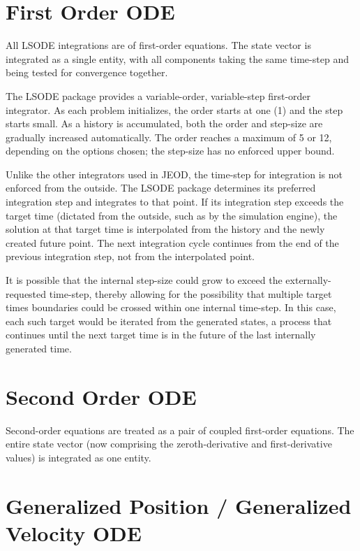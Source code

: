 \section{First Order ODE}

All LSODE integrations are of first-order equations.  The state vector is
integrated as a single entity, with all components taking the same
time-step and being tested for convergence together.

The LSODE package provides a variable-order, variable-step first-order
integrator.
As each problem initializes, the order starts at one (1) and the step starts
small.  As a history is accumulated, both the order and step-size are
gradually increased automatically.   The order reaches a maximum of 5 or
12, depending on the options chosen; the step-size has no enforced upper bound.

Unlike the other integrators used in JEOD, the time-step for integration is
not enforced from the outside.  The LSODE package determines its preferred
integration step and integrates to that point.  If its integration step
exceeds the target time (dictated from the outside, such as by the simulation
engine), the solution at that target time is interpolated from the history and
the newly created future point.  The next integration cycle continues from the
end of the previous integration step, not from the interpolated point.

It is possible that the internal step-size could grow to exceed the
externally-requested time-step, thereby allowing for the possibility that
multiple target times boundaries could be crossed within one
internal time-step.  In this case, each such target would be iterated from
the generated states, a process that continues until the next target time is
in the future of the last internally generated time.


\section{Second Order ODE}

Second-order equations are treated as a pair of coupled first-order
equations.  The entire state vector (now comprising the zeroth-derivative and
first-derivative values) is integrated as one entity.

\section{Generalized Position / Generalized Velocity ODE}

